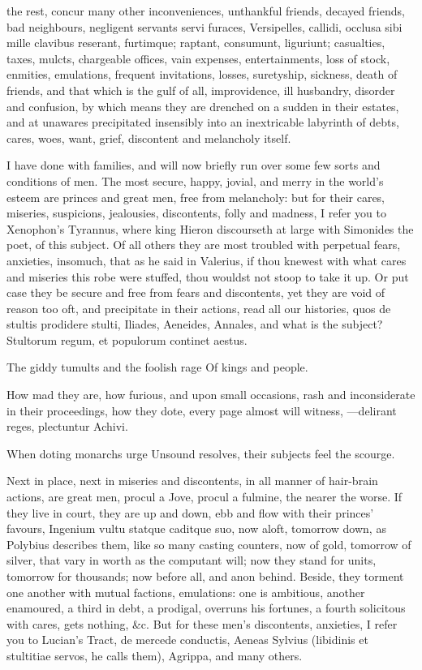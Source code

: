 {the rest, concur many other inconveniences, unthankful friends, decayed
friends, bad neighbours, negligent servants servi furaces,
Versipelles, callidi, occlusa sibi mille clavibus reserant, furtimque;
raptant, consumunt, liguriunt; casualties, taxes, mulcts, chargeable
offices, vain expenses, entertainments, loss of stock, enmities,
emulations, frequent invitations, losses, suretyship, sickness, death
of friends, and that which is the gulf of all, improvidence, ill
husbandry, disorder and confusion, by which means they are drenched on
a sudden in their estates, and at unawares precipitated insensibly into
an inextricable labyrinth of debts, cares, woes, want, grief,
discontent and melancholy itself.

I have done with families, and will now briefly run over some few sorts
and conditions of men. The most secure, happy, jovial, and merry in the
world's esteem are princes and great men, free from melancholy: but for
their cares, miseries, suspicions, jealousies, discontents, folly and
madness, I refer you to Xenophon's Tyrannus, where king Hieron
discourseth at large with Simonides the poet, of this subject. Of all
others they are most troubled with perpetual fears, anxieties,
insomuch, that as he said in Valerius, if thou knewest with what
cares and miseries this robe were stuffed, thou wouldst not stoop to
take it up. Or put case they be secure and free from fears and
discontents, yet they are void of reason too oft, and precipitate
in their actions, read all our histories, quos de stultis prodidere
stulti, Iliades, Aeneides, Annales, and what is the subject?
Stultorum regum, et populorum continet aestus.

The giddy tumults and the foolish rage
Of kings and people.

How mad they are, how furious, and upon small occasions, rash and
inconsiderate in their proceedings, how they dote, every page almost
will witness,
---delirant reges, plectuntur Achivi.

When doting monarchs urge
Unsound resolves, their subjects feel the scourge.

Next in place, next in miseries and discontents, in all manner of
hair-brain actions, are great men, procul a Jove, procul a fulmine, the
nearer the worse. If they live in court, they are up and down, ebb and
flow with their princes' favours, Ingenium vultu statque caditque suo,
now aloft, tomorrow down, as Polybius describes them, like so many
casting counters, now of gold, tomorrow of silver, that vary in worth
as the computant will; now they stand for units, tomorrow for
thousands; now before all, and anon behind. Beside, they torment one
another with mutual factions, emulations: one is ambitious, another
enamoured, a third in debt, a prodigal, overruns his fortunes, a fourth
solicitous with cares, gets nothing, \&c. But for these men's
discontents, anxieties, I refer you to Lucian's Tract, de mercede
conductis, Aeneas Sylvius (libidinis et stultitiae servos, he
calls them), Agrippa, and many others.

}
